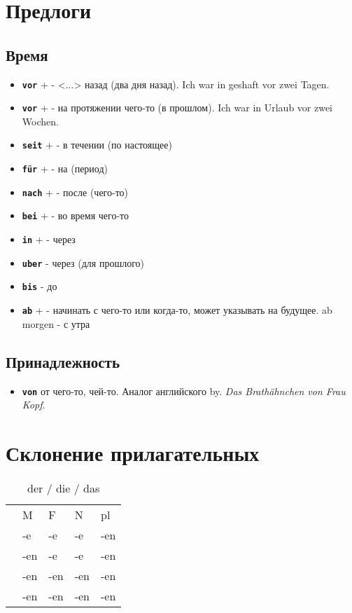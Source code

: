 \documentclass[12pt,a4paper]{report}
\newcommand{\term}[1]{\texttt{\textbf{#1}}}
\newcommand{\ubersatze}[1]{\textit{#1}}
\newcommand{\nom}{ {\color{black}{\textbf{N}}} }
\newcommand{\akk}{ {\color{red}{\textbf{A}}} }
\newcommand{\dat}{ {\color{blue}{\textbf{D}}} }
\newcommand{\gen}{ {\color{userdarkgreen}{\textbf{G}}} }
\begin{document}
\chapter{Предлоги}
\section{Время}
\begin{itemize}
 \item \term{vor} + \dat - <...> назад (два дня назад). Ich war in geshaft vor zwei Tagen.
 \item \term{vor} + \dat - на протяжении чего-то (в прошлом). Ich war in Urlaub vor zwei Wochen.
 \item \term{seit} + \dat - в течении (по настоящее)
 \item \term{für} + \akk - на (период)
 \item \term{nach} + \dat - после (чего-то)
 \item \term{bei} + \dat - во время чего-то
 \item \term{in} + \dat - через
 \item \term{uber} - через (для прошлого)
 \item \term{bis} - до
 \item \term{ab} + \dat - начинать с чего-то или когда-то, может указывать на будущее. ab morgen - с утра
\end{itemize}

\section{Принадлежность}
\begin{itemize}
\item \term{von} от чего-то, чей-то. Аналог английского by. \ubersatze{Das Brathähnchen von Frau Kopf}.
\end{itemize}

\chapter{Склонение прилагательных}

\begin{longtable}{ c l l l l }
\caption{der / die / das} \label{tab:long} \\
		& M 	& F 	& N 	& pl 	\\
\nom 	& -e 	& -e	&	-e	& -en	\\
\akk 	& -en 	& -e	&	-e	& -en	\\
\dat 	& -en 	& -en	&	-en	& -en	\\
\gen 	& -en 	& -en	&	-en	& -en	\\
\end{longtable}
\end{document}
